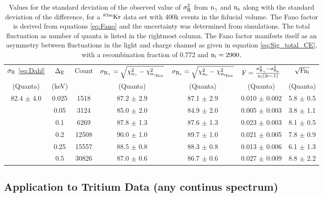\begin{table}[h!]
\begin{center}
\footnotesize
\tabcolsep=0.11cm
\begin{tabular}{|c||c|c|c|c|c|c|}
\hline
$\rm \sigma_R$ \ref{eq:Dahl} & $\rm \Delta_E$ & Count & $\rm \sigma_{R_\gamma}=\sqrt{\chi_{n_{\gamma}}^2-\chi_{n_{\gamma_{Det}}}^2}$ & $\rm \sigma_{R_e}= \sqrt{\chi_{n_{e}}^2-\chi_{n_{e_{Det}}}^2}$  & $\rm F=\frac{\sigma_{R_{\gamma}}^2-\sigma_{R_e}^2}{n_i(2r-1) }$ &$\rm \sqrt{Fn_i}$ \\ 
(Quanta) & (keV) & & (Quanta) & (Quanta) & (Quanta) & (Quanta)\\ \hline
82.4 $\pm$ 4.0		& 0.025		& 1518 		& 87.2 $\pm$ 2.9	 	&	87.1 $\pm$ 2.9	& 0.010 $\pm$ 0.002     & 5.8 $\pm$ 0.5 \\ \hline
					& 0.05 		& 3124 		& 85.0 $\pm$ 2.0	 	&	84.9 $\pm$ 2.0	& 0.005 $\pm$ 0.003	& 3.8 $\pm$ 1.1 \\ \hline
					& 0.1 		& 6269  	& 87.8 $\pm$ 1.3		& 	87.6 $\pm$ 1.3	& 0.023 $\pm$ 0.003	& 8.1 $\pm$ 0.5	 \\ \hline
					& 0.2 		&12508  	& 90.0 $\pm$ 1.0  		& 	89.7 $\pm$ 1.0	& 0.021 $\pm$ 0.005	& 7.8 $\pm$ 0.9	 \\ \hline
					& 0.25 		&15557 	& 88.5 $\pm$ 0.8		&	88.3 $\pm$ 0.8  & 0.013 $\pm$ 0.006	& 6.1 $\pm$ 1.3	 \\ \hline
					& 0.5		& 30826 	& 87.0  $\pm$ 0.6		&	86.7 $\pm$ 0.6	& 0.027	$\pm$  0.009 	& 8.8 $\pm$ 2.2	\\ \hline
\end{tabular}
\caption{Values for the standard deviation of the observed value of $\rm \sigma_R^2$ from $\rm n_\gamma$ and $\rm n_e$ along with the standard deviation of the difference, for a $\rm^{83m}Kr$ data set with 400k events in the fiducial volume. The Fano factor is derived from equations \ref{eq:Fano} and the uncertainty was determined from simulations. The total fluctuation as number of quanta is listed in the rightmost column. The Fano factor manifests itself as an asymmetry between fluctuations in the light and charge channel as given in equation \ref{eq:Sig_total_CE}, with a recombination fraction of 0.772 and $\rm n_i = 2900$. }%
\label{table:R_Kr}
\end{center}
\end{table}


\subsection{Application to Tritium Data (any continus spectrum)}

